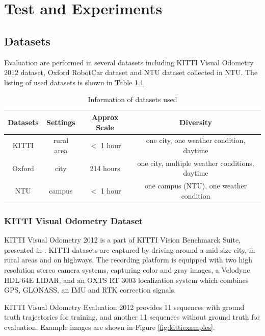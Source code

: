 
\chapter{Test and Experiments}

\section{Datasets}

Evaluation are performed in several datasets including KITTI Visual Odometry 2012 dataset\cite{Geiger2012CVPR},  Oxford RobotCar dataset\cite{maddern20171} and NTU dataset collected in NTU. The listing of used datasets is shown in Table \ref{tbl:datasetsinfo}


\begin{table}
	\centering
	\caption{Information of datasets used }
	\begin{tabular}{|c|c|c|c|}
		\hline
		Datasets & Settings & Approx Scale & Diversity \\
		\hline
		KITTI &  rural area & $<$ 1 hour & one city, one weather condition, daytime \\
		\hline
		Oxford &  city & 214 hours & one city, multiple weather conditions, daytime \\
		\hline
		NTU &  campus & $<$ 1 hour & one campus (NTU), one weather condition \\
		\hline
	\end{tabular}
	\label{tbl:datasetsinfo}
\end{table}

\subsection{KITTI Visual Odometry Dataset}

KITTI Visual Odometry 2012 is a part of KITTI Vision Benchmarck Suite, presented in \cite{Geiger2012CVPR,Menze2015CVPR}. KITTI datasets are captured by driving around a mid-size city, in rural areas and on highways. The recording platform is equipped with two high resolution stereo camera systems, capturing color and gray images, a Velodyne HDL-64E LIDAR, and an OXTS RT 3003 localization system which combines GPS, GLONASS, an IMU and RTK correction signals.

KITTI Visual Odometry Evaluation 2012 provides 11 sequences with ground truth trajectories for training, and another 11 sequences without ground truth for evaluation. Example images are shown in Figure \ref{fig:kittiexamples}. 

